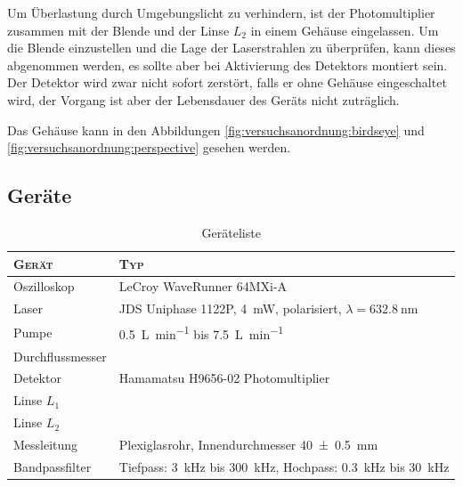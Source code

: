 Um \"Uberlastung  durch Umgebungslicht zu verhindern,  ist der Photomultiplier
zusammen mit der Blende und der Linse $L_2$ in einem Geh\"ause eingelassen. Um
die Blende einzustellen und die Lage der Laserstrahlen zu \"uberpr\"ufen, kann
dieses  abgenommen  werden,  es  sollte aber  bei  Aktivierung  des  Detektors
montiert sein. Der Detektor  wird zwar nicht sofort zerst\"ort,  falls er ohne
Geh\"ause  eingeschaltet  wird,  der  Vorgang ist  aber  der  Lebensdauer  des
Ger\"ats nicht zutr\"aglich.

Das Geh\"ause kann in den Abbildungen \ref{fig:versuchsanordnung:birdseye} und
\ref{fig:versuchsanordnung:perspective} gesehen werden.


\clearpage
\subsection{Ger\"ate}
\label{subsec:messgerate}

\begin{table}[h!t]
    \centering
    \caption{Ger\"ateliste}
    \begin{tabular}{ll}
        \toprule
        \textsc{Ger\"at}
        & \textsc{Typ}
        \\

        \midrule

        Oszilloskop
        & LeCroy WaveRunner 64MXi-A
        \\

        Laser
        & JDS Uniphase 1122P, \SI{4}{\milli\watt}, polarisiert, $\lambda = \SI{632,8}{\nano\meter}$
        \\

        Pumpe
        & \SI{0.5}{\liter\per\minute} bis \SI{7.5}{\liter\per\minute} %
        \\

        Durchflussmesser
        & %
        \\

        Detektor
        & Hamamatsu H9656-02 Photomultiplier
        \\

        Linse $L_1$
        & %
        \\

        Linse $L_2$
        & \\

        Messleitung
        & Plexiglasrohr, Innendurchmesser \SI{40 \pm 0.5}{\milli\meter}
        \\

        Bandpassfilter
        & Tiefpass: \SI{3}{\kilo\hertz} bis \SI{300}{\kilo\hertz}, Hochpass: \SI{0.3}{\kilo\hertz} bis \SI{30}{\kilo\hertz}
        \\

        \bottomrule
    \end{tabular}
\end{table}

